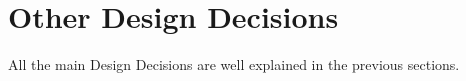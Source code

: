 \documentclass[../../../../dd.tex]{subfiles}
\begin{document}
	\section{Other Design Decisions}
		All the main Design Decisions are well explained in the previous sections.
	
\end{document}
